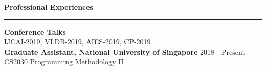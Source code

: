 \documentclass[a4paper,11pt,final]{article}
\newcommand{\Sep}{\vspace{1.5em}}
\newcommand{\SmallSep}{\vspace{0.5em}}
\begin{document}
\Sep
\Large { \textbf{Professional Experiences}}\\
\noindent\rule{\textwidth}{1pt}
\normalsize
\textbf{Conference Talks}\\
IJCAI-2019, VLDB-2019, AIES-2019, CP-2019\\

\SmallSep
\textbf{Graduate Assistant, National University of Singapore}\hspace*{\fill} 2018  - Present\\
CS2030 Programming Methodology II
\end{document}
